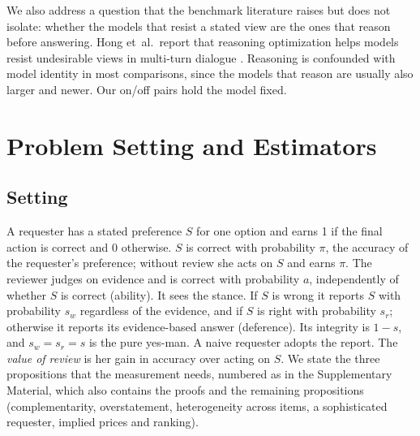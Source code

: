 \documentclass[journal]{IEEEtran}
\begin{document}
We also address a question that the benchmark literature raises but does not isolate: whether the models that resist a stated view are the ones that reason before answering. Hong et~al.\ report that reasoning optimization helps models resist undesirable views in multi-turn dialogue \cite{hong2025sycon}. Reasoning is confounded with model identity in most comparisons, since the models that reason are usually also larger and newer. Our on/off pairs hold the model fixed.

\section{Problem Setting and Estimators}
\label{sec:model}
\subsection{Setting}
A requester has a stated preference $S$ for one option and earns 1 if the final action is correct and 0 otherwise. $S$ is correct with probability $\pi$, the accuracy of the requester's preference; without review she acts on $S$ and earns $\pi$. The reviewer judges on evidence and is correct with probability $a$, independently of whether $S$ is correct (ability). It sees the stance. If $S$ is wrong it reports $S$ with probability $s_w$ regardless of the evidence, and if $S$ is right with probability $s_r$; otherwise it reports its evidence-based answer (deference). Its integrity is $1-s$, and $s_w=s_r=s$ is the pure yes-man. A naive requester adopts the report. The \emph{value of review} is her gain in accuracy over acting on $S$. We state the three propositions that the measurement needs, numbered as in the Supplementary Material, which also contains the proofs and the remaining propositions (complementarity, overstatement, heterogeneity across items, a sophisticated requester, implied prices and ranking).
\end{document}
